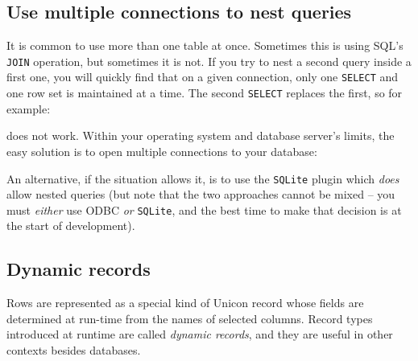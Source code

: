 \subsection*{Use multiple connections to nest queries}

\label{NestedSQL}
It is common to use more than one table at once. Sometimes this is
using SQL's \texttt{JOIN} operation, but sometimes it
is not. If you try to nest a second query inside a first one, you will
quickly find that on a given connection, only one \texttt{SELECT} and
one row set is maintained at a time. The second \texttt{SELECT}
replaces the first, so for example:


\noindent
does not work. Within your operating system and database
server's limits, the easy solution is to open multiple
connections to your database:


An alternative, if the situation allows it, is to use the \texttt{SQLite} plugin
which {\em does \/}allow nested queries (but note that the two approaches cannot
be mixed -- you must {\em either \/}use ODBC {\em or \/} \texttt{SQLite}, and
the best time to make that decision is at the start of development).

\subsection*{Dynamic records}

Rows are represented as a special kind of Unicon record whose
fields are determined at run-time from the names
of selected columns. Record types introduced at runtime
are called \textit{dynamic records}, and they are useful in other
contexts besides databases.

